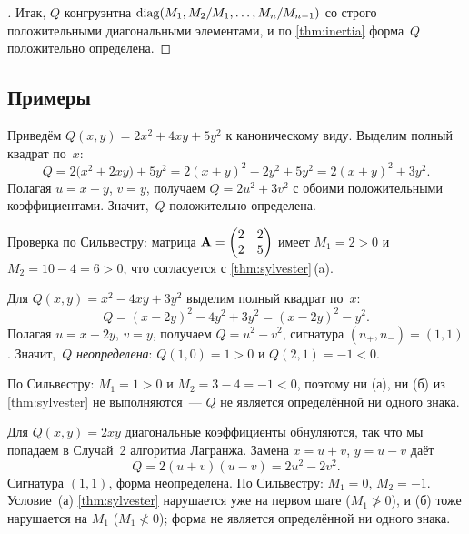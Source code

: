 \begin{proof}[]
Итак, $Q$ конгруэнтна $\operatorname{diag}(M_1, M_2/M_1, \dots, M_n/M_{n-1})$ со
строго положительными диагональными элементами, и по
\cref{thm:inertia} форма~$Q$ положительно определена.
\end{proof}

\subsection*{Примеры}

\begin{example}
\label{ex:lagrange-pos-def}
Приведём $Q(x, y) = 2x^2 + 4xy + 5y^2$ к каноническому виду. Выделим
полный квадрат по~$x$:
\[
  Q = 2\bigl(x^2 + 2xy\bigr) + 5y^2 = 2(x + y)^2 - 2y^2 + 5y^2 = 2(x + y)^2 + 3y^2.
\]
Полагая $u = x + y$, $v = y$, получаем $Q = 2u^2 + 3v^2$ с обоими
положительными коэффициентами. Значит,~$Q$ положительно определена.

Проверка по Сильвестру: матрица $\mathbf{A} = \begin{pmatrix} 2 & 2 \\ 2 & 5 \end{pmatrix}$
имеет $M_1 = 2 > 0$ и $M_2 = 10 - 4 = 6 > 0$, что согласуется с
\cref{thm:sylvester}\,(a).
\end{example}

\begin{example}
\label{ex:lagrange-indefinite}
Для $Q(x, y) = x^2 - 4xy + 3y^2$ выделим полный квадрат по~$x$:
\[
  Q = (x - 2y)^2 - 4y^2 + 3y^2 = (x - 2y)^2 - y^2.
\]
Полагая $u = x - 2y$, $v = y$, получаем $Q = u^2 - v^2$, сигнатура
$(n_+, n_-) = (1, 1)$. Значит,~$Q$ \emph{неопределена}: $Q(1, 0) = 1 > 0$
и $Q(2, 1) = -1 < 0$.

По Сильвестру: $M_1 = 1 > 0$ и $M_2 = 3 - 4 = -1 < 0$, поэтому ни (а),
ни (б) из \cref{thm:sylvester} не выполняются~--- $Q$ не является
определённой ни одного знака.
\end{example}

\begin{example}[Чистый внедиагональный случай: $Q = 2xy$]
\label{ex:lagrange-off-diagonal}
Для $Q(x, y) = 2xy$ диагональные коэффициенты обнуляются, так что мы
попадаем в Случай~2 алгоритма Лагранжа. Замена $x = u + v$,
$y = u - v$ даёт
\[
  Q = 2(u + v)(u - v) = 2u^2 - 2v^2.
\]
Сигнатура $(1, 1)$, форма неопределена. По Сильвестру: $M_1 = 0$,
$M_2 = -1$. Условие~(а) \cref{thm:sylvester} нарушается уже на первом
шаге ($M_1 \not> 0$), и (б) тоже нарушается на $M_1$ ($M_1 \not< 0$);
форма не является определённой ни одного знака.
\end{example}

